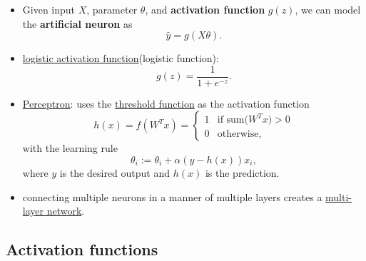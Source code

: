 \documentclass[twocolumn,landscape,10pt]{article}
\theoremstyle{definition}
\begin{document}
\begin{itemize}
    \item Given input $X$, parameter $\theta$, and \textbf{activation function}
        $g(z)$, we can model the \textbf{artificial neuron} as
        \[
            \hat{y}=g(X\theta).
        \]
    \item \underline{logistic activation function}(logistic function): 
        \[
            g(z)=\frac{1}{1+e^{-z}}.
        \]
    \item \underline{Perceptron}: uses the \underline{threshold function} as the
        activation function
        \[
            h(x) = f(W^Tx) =
            \begin{cases}
                1 & \text{if sum($W^Tx$)} > 0 \\
                0 & \text{otherwise},
            \end{cases} 
        \]
        with the learning rule
        \[
            \theta_i := \theta_i + \alpha(y-h(x))x_i,
        \]
        where $y$ is the desired output and $h(x)$ is the prediction.
    \item connecting multiple neurons in a manner of multiple layers creates a
        \underline{multi-layer network}.
\end{itemize} 

\subsection{Activation functions}
\end{document}
